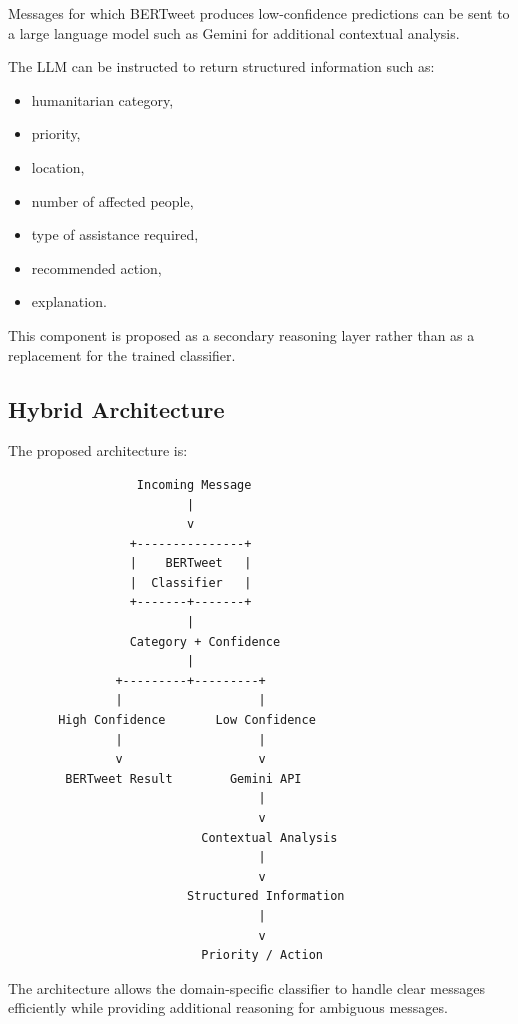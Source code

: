 \documentclass[12pt,a4paper]{article}
\begin{document}
Messages for which BERTweet produces low-confidence predictions can be sent to
a large language model such as Gemini for additional contextual analysis.

The LLM can be instructed to return structured information such as:

\begin{itemize}
    \item humanitarian category,
    \item priority,
    \item location,
    \item number of affected people,
    \item type of assistance required,
    \item recommended action,
    \item explanation.
\end{itemize}

This component is proposed as a secondary reasoning layer rather than as a
replacement for the trained classifier.

\subsection{Hybrid Architecture}

The proposed architecture is:

\begin{verbatim}
                  Incoming Message
                         |
                         v
                 +---------------+
                 |    BERTweet   |
                 |  Classifier   |
                 +-------+-------+
                         |
                 Category + Confidence
                         |
               +---------+---------+
               |                   |
       High Confidence       Low Confidence
               |                   |
               v                   v
        BERTweet Result        Gemini API
                                   |
                                   v
                           Contextual Analysis
                                   |
                                   v
                         Structured Information
                                   |
                                   v
                           Priority / Action
\end{verbatim}

The architecture allows the domain-specific classifier to handle clear
messages efficiently while providing additional reasoning for ambiguous
messages.
\end{document}
